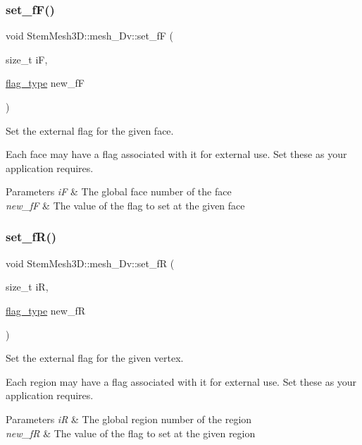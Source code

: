 \subsubsection{\texorpdfstring{set\+\_\+f\+F()}{set\_fF()}}
{\footnotesize\ttfamily void Stem\+Mesh3\+D\+::mesh\+\_\+Dv\+::set\+\_\+fF (\begin{DoxyParamCaption}\item[{size\+\_\+t}]{iF,  }\item[{\hyperlink{classStemMesh3D_1_1mesh__3Dv_a9544cba555b60f17f04fcd1689314338}{flag\+\_\+type}}]{new\+\_\+fF }\end{DoxyParamCaption})}



Set the external flag for the given face. 

Each face may have a flag associated with it for external use. Set these as your application requires. 
\begin{DoxyParams}{Parameters}
{\em iF} & The global face number of the face \\
\hline
{\em new\+\_\+fF} & The value of the flag to set at the given face \\
\hline
\end{DoxyParams}
\mbox{\label{classStemMesh3D_1_1mesh__3Dv_a0ac5f5f5f81fa2afcbe8a36990d9df21}} 
\subsubsection{\texorpdfstring{set\+\_\+f\+R()}{set\_fR()}}
{\footnotesize\ttfamily void Stem\+Mesh3\+D\+::mesh\+\_\+Dv\+::set\+\_\+fR (\begin{DoxyParamCaption}\item[{size\+\_\+t}]{iR,  }\item[{\hyperlink{classStemMesh3D_1_1mesh__3Dv_a9544cba555b60f17f04fcd1689314338}{flag\+\_\+type}}]{new\+\_\+fR }\end{DoxyParamCaption})}



Set the external flag for the given vertex. 

Each region may have a flag associated with it for external use. Set these as your application requires. 
\begin{DoxyParams}{Parameters}
{\em iR} & The global region number of the region \\
\hline
{\em new\+\_\+fR} & The value of the flag to set at the given region \\
\hline
\end{DoxyParams}
\mbox{\label{classStemMesh3D_1_1mesh__3Dv_a4bc6f51b9675c7dca59ab8ccfc256a44}} 

